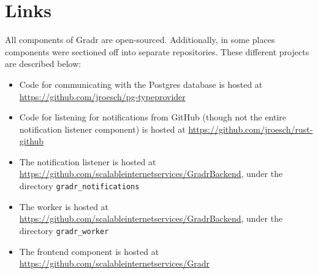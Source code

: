 \documentclass{scrartcl}
\begin{document}
\section{Links}
All components of Gradr are open-sourced.
Additionally, in some places components were sectioned off into separate repositories.
These different projects are described below:

\begin{itemize}
  \item Code for communicating with the Postgres database is hosted at \url{https://github.com/jroesch/pg-typeprovider}

  \item Code for listening for notifications from GitHub (though not the entire notification listener component) is hosted at \url{https://github.com/jroesch/rust-github}

  \item The notification listener is hosted at \url{https://github.com/scalableinternetservices/GradrBackend}, under the directory \texttt{gradr\_notifications}

  \item The worker is hosted at \url{https://github.com/scalableinternetservices/GradrBackend}, under the directory \texttt{gradr\_worker}

  \item The frontend component is hosted at \url{https://github.com/scalableinternetservices/Gradr}
\end{itemize}

{}

\end{document}
